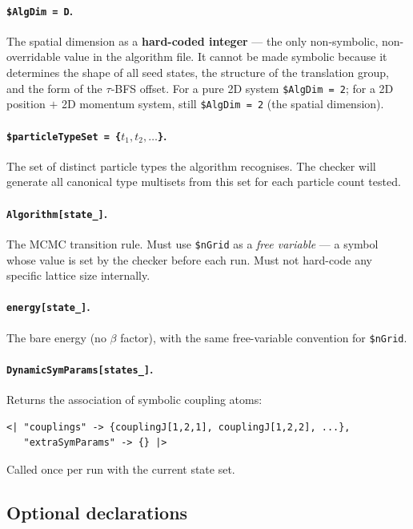 \documentclass[12pt,a4paper]{article}
\begin{document}
\paragraph{\texttt{\$AlgDim = D}.}
The spatial dimension as a \textbf{hard-coded integer} --- the only
non-symbolic, non-overridable value in the algorithm file.  It cannot be made
symbolic because it determines the shape of all seed states, the structure of
the translation group, and the form of the $\tau$-BFS offset.  For a pure 2D
system \texttt{\$AlgDim = 2}; for a 2D position $+$ 2D momentum system, still
\texttt{\$AlgDim = 2} (the spatial dimension).

\paragraph{\texttt{\$particleTypeSet = \{$t_1, t_2, \ldots$\}}.}
The set of distinct particle types the algorithm recognises.  The checker will
generate all canonical type multisets from this set for each particle count
tested.

\paragraph{\texttt{Algorithm[state\_]}.}
The MCMC transition rule.  Must use \texttt{\$nGrid} as a \emph{free variable}
--- a symbol whose value is set by the checker before each run.  Must not
hard-code any specific lattice size internally.

\paragraph{\texttt{energy[state\_]}.}
The bare energy (no $\beta$ factor), with the same free-variable convention for
\texttt{\$nGrid}.

\paragraph{\texttt{DynamicSymParams[states\_]}.}
Returns the association of symbolic coupling atoms:
\begin{lstlisting}
<| "couplings" -> {couplingJ[1,2,1], couplingJ[1,2,2], ...},
   "extraSymParams" -> {} |>
\end{lstlisting}
Called once per run with the current state set.

\subsection{Optional declarations}
\end{document}
